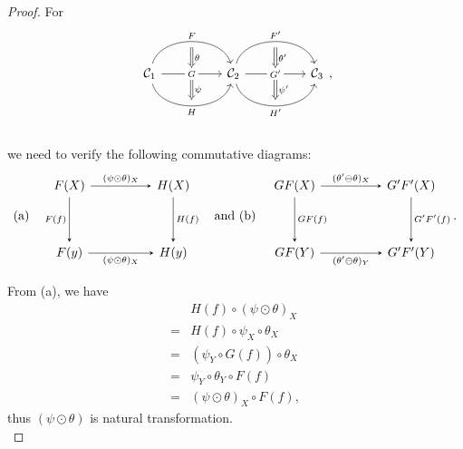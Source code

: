 \documentclass{article}
\begin{document}
\begin{proof}
	For
	\[\begin{tikzcd}
		\ca_1
		\arrow[bend left=75, rr, "F", ""' name=F] \arrow[rr, "G" description, "" name=G, ""' name=GG] \arrow[bend right=75, rr, "H"', "" name=H] & &
		\arrow[Rightarrow, from=F, to=G, "\theta"] \arrow[Rightarrow, from=GG, to=H, "\psi"]
		\ca_2 \arrow[bend left=75, rr, "F'", ""' name=F'] \arrow[rr, "G'" description, "" name=G', ""' name=GG'] \arrow[bend right=75, rr, "H'"', "" name=H'] & &
		\arrow[Rightarrow, from=F', to=G', "\theta'"] \arrow[Rightarrow, from=GG', to=H', "\psi'"] \ca_3
	\end{tikzcd},\]\\
	we need to verify the following commutative diagrams:
		\[\text{(a)}\quad\begin{tikzcd}
				F(X) \arrow[->,>=stealth,dd,"F(f)"'] \arrow[->,>=stealth,rr,"(\psi\odot\theta)_X"] && H(X) \arrow[->,>=stealth,dd,"H(f)"]\\ && \\
				F(y) \arrow[->,>=stealth,rr,"(\psi\odot\theta)_X"'] && H(y)
			\end{tikzcd}\quad\text{and (b)}\quad\begin{tikzcd}
				GF(X) \arrow[->,>=stealth,dd,"GF(f)"] \arrow[->,>=stealth,rr,"(\theta'\ominus\theta)_X"] && G'F'(X) \arrow[->,>=stealth,dd,"G'F'(f)"]\\ && \\
				GF(Y) \arrow[->,>=stealth,rr,"(\theta'\ominus\theta)_Y"'] && G'F'(Y)
		\end{tikzcd}.\]
	
	From (a), we have
	\begin{align*}
		& H(f)\circ(\psi\odot\theta)_X\\
		=& H(f)\circ\psi_X\circ\theta_X\tag{Def: vertical composition}\\
		=& (\psi_Y\circ G(f))\circ\theta_X\tag{Property of natural transformation $\psi$}\\
		=& \psi_Y\circ\theta_Y\circ F(f)\tag{Property of natural transformation $\theta$}\\
		=& (\psi\odot\theta)_X\circ F(f),\tag{Def: vertical composition}
	\end{align*}
	thus $(\psi\odot\theta)$ is natural transformation.\\
		

\end{proof}
\end{document}
